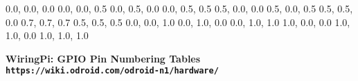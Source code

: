 \documentclass[12pt,a4paper]{article}
\begin{document}
\begin{sffamily}
\definecolor{rtb-black}{rgb}  {0.0, 0.0, 0.0}
\definecolor{rtb-navy}{rgb}   {0.0, 0.0, 0.5}
\definecolor{rtb-green}{rgb}  {0.0, 0.5, 0.0}
\definecolor{rtb-teal}{rgb}   {0.0, 0.5, 0.5}
\definecolor{rtb-maroon}{rgb} {0.5, 0.0, 0.0}
\definecolor{rtb-purple}{rgb} {0.5, 0.0, 0.5}
\definecolor{rtb-olive}{rgb}  {0.5, 0.5, 0.0}
\definecolor{rtb-silver}{rgb} {0.7, 0.7, 0.7}
\definecolor{rtb-grey}{rgb}   {0.5, 0.5, 0.5}
\definecolor{rtb-blue}{rgb}   {0.0, 0.0, 1.0}
\definecolor{rtb-lime}{rgb}   {0.0, 1.0, 0.0}
\definecolor{rtb-aqua}{rgb}   {0.0, 1.0, 1.0}
\definecolor{rtb-red}{rgb}    {1.0, 0.0, 0.0}
\definecolor{rtb-yellow}{rgb} {1.0, 1.0, 0.0}
\definecolor{rtb-white}{rgb}  {1.0, 1.0, 1.0}

\begin{center}
\bfseries{WiringPi: GPIO Pin Numbering Tables}\\
\tt{https://wiki.odroid.com/odroid-n1/hardware/}
\end{center}


\end{sffamily}
\end{document}

